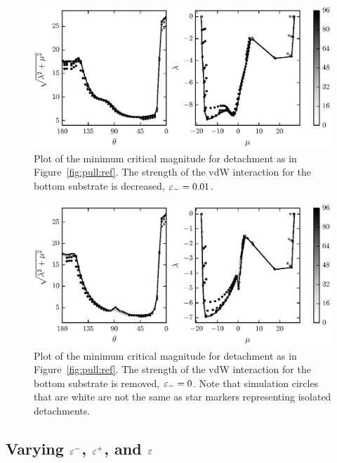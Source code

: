    \begin{figure}[t]
      \begin{center}
         \includegraphics{./fig/ch3/pull/eb0.01/grid.eps}
      \end{center}      
      \caption{Plot of the minimum critical magnitude for detachment as in Figure~\ref{fig:pull:ref}. The strength of the vdW interaction for the bottom substrate is decreased, $\varepsilon_-=0.01$. 
      \label{fig:pull:eb0.01}}
   \end{figure}
   
   \begin{figure}[t]
      \begin{center}
         \includegraphics{./fig/ch3/pull/eb0/grid.eps}
      \end{center}      
      \caption{Plot of the minimum critical magnitude for detachment as in Figure~\ref{fig:pull:ref}. The strength of the vdW interaction for the bottom substrate is removed, $\varepsilon_-=0$. Note that simulation circles that are white are not the same as star markers representing isolated detachments.
      \label{fig:pull:eb0}}
   \end{figure}

\subsection{Varying $\varepsilon^-$, $\varepsilon^+$, and $\varepsilon$} \label{section:detachment:eps}

